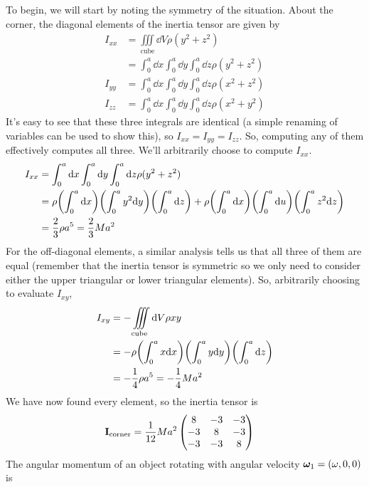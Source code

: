 \begin{example}
    To begin, we will start by noting the symmetry of the situation. About the corner, the diagonal elements of the inertia tensor are given by
    \begin{align*}
        I_{xx} &= \iiint \limits_{\text{cube}} \dd V \rho (y^2+z^2) \\
        &= \int_0^a\dd x \int_0^a\dd y \int_0^a\dd z \rho(y^2+z^2) \\
        I_{yy} &= \int_0^a\dd x \int_0^a\dd y \int_0^a\dd z \rho(x^2+z^2) \\
        I_{zz} &= \int_0^a\dd x \int_0^a\dd y \int_0^a\dd z \rho(x^2+y^2)
    \end{align*}
    It's easy to see that these three integrals are identical (a simple renaming of variables can be used to show this), so $I_{xx} = I_{yy} = I_{zz}$. So, computing any of them effectively computes all three. We'll arbitrarily choose to compute $I_{xx}$. 
    \begin{align*}
        I_{xx} &= \int_0^a\dd x \int_0^a\dd y \int_0^a\dd z \rho(y^2+z^2) \\
        &= \rho \pqty{\int_0^a\dd x}\pqty{\int_0^ay^2\dd y}\pqty{\int_0^a \dd z} + \rho \pqty{\int_0^a\dd x}\pqty{\int_0^a\dd u}\pqty{\int_0^a z^2\dd z} \\
        &= \frac{2}{3}\rho a^5 = \frac{2}{3}Ma^2
    \end{align*}
    For the off-diagonal elements, a similar analysis tells us that all three of    them are equal (remember that the inertia tensor is symmetric so we only need to consider either the upper triangular or lower triangular elements). So, arbitrarily choosing to evaluate $I_{xy}$,
    \begin{align*}
        I_{xy} &= -\iiint\limits_\text{cube} \dd V\rho xy \\
        &= -\rho \pqty{\int_0^a x\dd x}\pqty{\int_0^a y\dd y}\pqty{\int_0^a \dd z} \\
        &= -\frac{1}{4}\rho a^5 = -\frac{1}{4}Ma^2 
    \end{align*}
    We have now found every element, so the inertia tensor is   
    \begin{align*}
        \mathbf{I}_\text{corner} &= \frac{1}{12}Ma^2\begin{pmatrix}
            8 & -3 & -3 \\
            -3 & 8 & -3 \\
            -3 & -3 & 8
        \end{pmatrix}
    \end{align*}
    The angular momentum of an object rotating with angular velocity $\boldsymbol{\omega}_1 = (\omega, 0 ,0)$ is 

\end{example}
